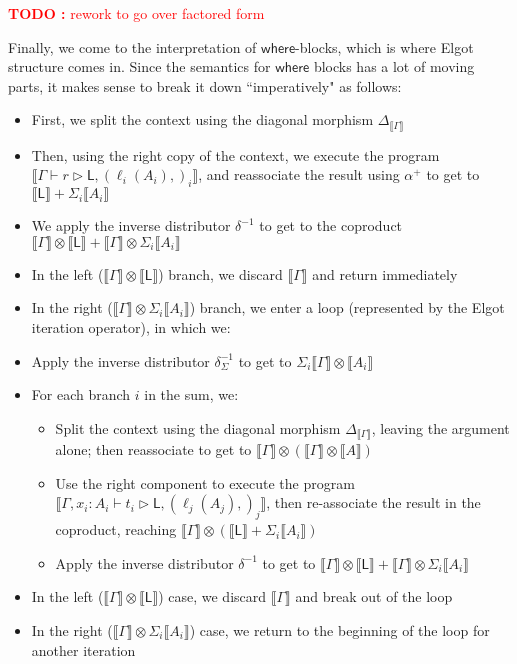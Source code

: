 \documentclass[acmsmall,screen,review]{acmart}
\newcounter{todos}
\newcommand{\TODO}[1]{{
  \stepcounter{todos}
  \begin{center}\large{\textcolor{red}{\textbf{TODO \arabic{todos}:} #1}}\end{center}
}}
\newcommand{\ms}[1]{\ensuremath{\mathsf{#1}}}
\newcommand{\bhyp}[2]{#1 : #2}
\newcommand{\lhyp}[2]{#1(#2)}
\newcommand{\haslb}[3]{#1 \vdash #2 \rhd #3}
\newcommand{\dnt}[1]{\llbracket{#1}\rrbracket}
\begin{document}
\TODO{rework to go over factored form}
Finally, we come to the interpretation of \ms{where}-blocks, which is where Elgot structure comes
in. Since the semantics for \ms{where} blocks has a lot of moving parts, it makes sense to break it
down ``imperatively" as follows:
\begin{itemize}
  \item First, we split the context using the diagonal morphism $\Delta_{\dnt{\Gamma}}$
  \item Then, using the right copy of the context, we execute the program
  $\dnt{\haslb{\Gamma}{r}{\ms{L}, (\lhyp{\ell_i}{A_i},)_i}}$, and reassociate the result using
  $\alpha^+$ to get to $\dnt{\ms{L}} + \Sigma_i\dnt{A_i}$
  \item We apply the inverse distributor $\delta^{-1}$ to get to the coproduct $\dnt{\Gamma} \otimes
  \dnt{\ms{L}} + \dnt{\Gamma} \otimes \Sigma_i \dnt{A_i}$
  \item In the left ($\dnt{\Gamma} \otimes \dnt{\ms{L}}$) branch, we discard $\dnt{\Gamma}$ and
  return immediately
  \item In the right ($\dnt{\Gamma} \otimes \Sigma_i \dnt{A_i}$) branch, we enter a loop
  (represented by the Elgot iteration operator), in which we:
  \item Apply the inverse distributor $\delta^{-1}_{\Sigma}$ to get to 
        $\Sigma_i \dnt{\Gamma} \otimes \dnt{A_i}$
  \item For each branch $i$ in the sum, we:
  \begin{itemize}
    \item Split the context using the diagonal morphism $\Delta_{\dnt{\Gamma}}$, leaving the
    argument alone; then reassociate to get to $\dnt{\Gamma} \otimes (\dnt{\Gamma} \otimes \dnt{A})$
    \item Use the right component to execute the program $\dnt{\haslb{\Gamma,
    \bhyp{x_i}{A_i}}{t_i}{\ms{L}, (\lhyp{\ell_j}{A_j},)_j}}$, then re-associate the result in the
    coproduct, reaching $\dnt{\Gamma} \otimes (\dnt{\ms{L}} + \Sigma_i\dnt{A_i})$
    \item Apply the inverse distributor $\delta^{-1}$ to get to 
      $\dnt{\Gamma} \otimes \dnt{\ms{L}} + \dnt{\Gamma} \otimes \Sigma_i\dnt{A_i}$
  \end{itemize}
  \item In the left ($\dnt{\Gamma} \otimes \dnt{\ms{L}}$) case, we discard $\dnt{\Gamma}$ and break
  out of the loop
  \item In the right ($\dnt{\Gamma} \otimes \Sigma_i\dnt{A_i}$) case, we return to the beginning
  of the loop for another iteration
\end{itemize}
\end{document}
